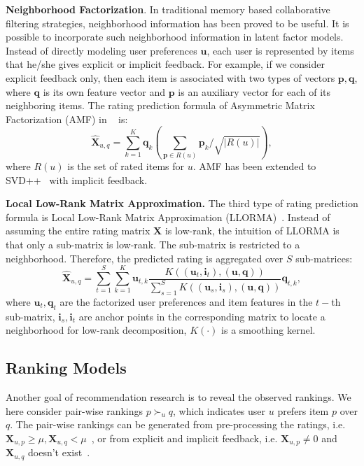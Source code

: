\documentclass[letterpaper]{article} %
\newcommand{\Rating}{\mathbf{X}}
\begin{document}
\textbf{Neighborhood Factorization}. In traditional memory based collaborative filtering strategies, neighborhood information has been proved to be useful. It is possible  to incorporate such neighborhood information in latent factor models. Instead of directly modeling user preferences $\mathbf{u}$, each user is represented by items that he/she gives explicit or implicit feedback. For example, if we consider explicit feedback only, then each item is associated with two types of vectors $\mathbf{p},\mathbf{q}$, where $\mathbf{q}$ is its own feature vector and $\mathbf{p}$ is an auxiliary vector for each of its neighboring items. The rating prediction formula of Asymmetric Matrix Factorization (AMF) in ~\cite{Koren2008Factorization} is:  
 \begin{equation}\label{equ:AMF}
\hat{\Rating}_{u,q}=\sum_{k=1}^{K} \mathbf{q}_{k} (\sum_{\mathbf{p} \in R(u)} \mathbf{p}_k/\sqrt{|R(u)|} ),
\end{equation}
where  $R(u)$ is the set of rated items for $u$. AMF has been extended to SVD++~\cite{Koren2008Factorization} with implicit feedback. 

\textbf{Local Low-Rank Matrix Approximation.} The third type of rating prediction formula is  Local Low-Rank Matrix Approximation (LLORMA)~\cite{Lee2016LLORMA}. Instead of assuming the entire rating matrix $\Rating$ is low-rank, the intuition of LLORMA is that only a sub-matrix is low-rank. The sub-matrix is restricted to a neighborhood. Therefore, the predicted rating is aggregated over $S$ sub-matrices:
\begin{equation}\label{equ:LLORMA}
\hat{\Rating}_{u,q} = \sum_{t=1}^{S} \sum_{k=1}^K \mathbf{u}_{t, k} \frac{K((\mathbf{u}_t,\mathbf{i}_t),(\mathbf{u},\mathbf{q}))}{\sum_{s=1}^{S} K((\mathbf{u}_s,\mathbf{i}_s),(\mathbf{u},\mathbf{q}))} \mathbf{q}_{t,k},
\end{equation}
where $\mathbf{u}_t, \mathbf{q}_t$ are the factorized user preferences and item features in the $t-$th sub-matrix,  $\mathbf{i}_s,\mathbf{i}_t$ are anchor points in the corresponding matrix to locate a neighborhood for low-rank decomposition, $K(\cdot)$ is a smoothing kernel. 
\subsection{Ranking Models}
Another goal of recommendation research is to reveal the observed rankings. We here consider pair-wise rankings $p\succ_u q$, which indicates user $u$ prefers item $p$ over $q$. The pair-wise rankings can be generated from pre-processing  the ratings, i.e. $\Rating_{u,p}\geq \mu, \Rating_{u,q}<\mu$~\cite{Hu2017Decoupled}, or from explicit and implicit feedback, i.e. $\Rating_{u,p}\neq 0$ and $ \Rating_{u,q}$ doesn't exist~\cite{Rendle2009BPR}. 
\end{document}
